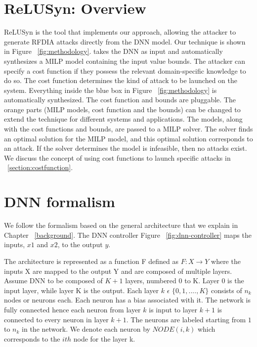 \section{ReLUSyn: Overview}
ReLUSyn is the tool that implements our approach, allowing the attacker to generate \ac{RFDIA} attacks directly from the \ac{DNN} model. 
Our technique is shown in Figure ~\ref{fig:methodology}.
\tool takes the \ac{DNN} as input and automatically synthesizes a \ac{MILP} model containing the input value bounds.
The attacker can specify a cost function if they possess the relevant domain-specific knowledge to do so. 
The cost function determines the kind of attack to be launched on the system.
Everything inside the blue box in Figure ~\ref{fig:methodology} is automatically synthesized.
The cost function and bounds are pluggable. 
The orange parts (\ac{MILP} models, cost function and the bounds) can be changed to extend the technique for different systems and applications. 
The models, along with the cost functions and bounds, are passed to a MILP solver. 
The solver finds an optimal solution for the MILP model, and this optimal solution corresponds to an attack. If the solver determines the model is infeasible, then no attacks exist.
 We discuss the concept of using cost functions to launch specific attacks in ~\ref{section:costfunction}. 
 



 
	
\section{DNN formalism}
We follow the formalism based on the general architecture that we explain in Chapter ~\ref{background}. 
The \ac{DNN} controller
 Figure ~\ref{fig:dnn-controller} maps the inputs, $x1$ and $x2$, to the output $y$. 



The architecture is represented as a function F defined as $F: X \rightarrow Y$ where the inputs X are mapped to the output Y and are composed of multiple layers. 
Assume \ac{DNN} to be composed of $K + 1$ layers, numbered 0 to K.
Layer 0 %
is the input layer, while layer K is the output.
Each layer $k$ $\epsilon$ $\{0,1,....,K\}$ consists of $n_k$ nodes or neurons each.
Each neuron has a bias associated with it. 
The network is fully connected hence each neuron from layer $k$ is input to layer $k+1$ is connected to every neuron in layer $k+1$. 
The neurons are labeled starting from $1$ to $n_k$ in the network. 
We denote each neuron by $NODE(i,k)$ which corresponds to the $ith$ node for the layer k. 

